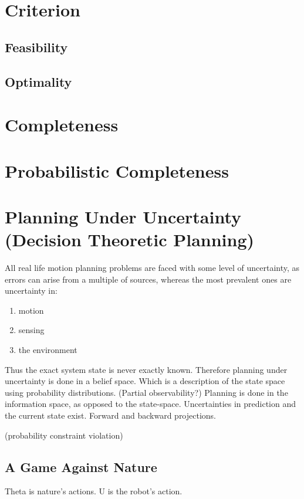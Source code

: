 \section{Criterion}

\subsection{Feasibility}
\subsection{Optimality}

\section{Completeness}

\section{Probabilistic Completeness}

\section{Planning Under Uncertainty (Decision Theoretic Planning)}

All real life motion planning problems are faced with some level of uncertainty,
as errors can arise from a multiple of sources, whereas the most prevalent ones
are uncertainty in:
\begin{enumerate}
\item motion
\item sensing
\item the environment
\end{enumerate}
Thus the exact system state is never exactly known. Therefore planning under
uncertainty is done in a belief space. Which is a description of the state space
using probability distributions. (Partial observability?) Planning is done in
the information space, as opposed to the state-space. Uncertainties in
prediction and the current state exist. Forward and backward projections.

(probability constraint violation)

\subsection{A Game Against Nature}

Theta is nature's actions. U is the robot's action.

